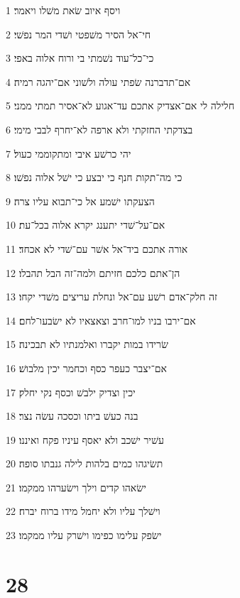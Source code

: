 \par 1 ויסף איוב שׂאת משׁלו ויאמר׃
\par 2 חי־אל הסיר משׁפטי ושׁדי המר נפשׁי׃
\par 3 כי־כל־עוד נשׁמתי בי ורוח אלוה באפי׃
\par 4 אם־תדברנה שׂפתי עולה ולשׁוני אם־יהגה רמיה׃
\par 5 חלילה לי אם־אצדיק אתכם עד־אגוע לא־אסיר תמתי ממני׃
\par 6 בצדקתי החזקתי ולא ארפה לא־יחרף לבבי מימי׃
\par 7 יהי כרשׁע איבי ומתקוממי כעול׃
\par 8 כי מה־תקות חנף כי יבצע כי ישׁל אלוה נפשׁו׃
\par 9 הצעקתו ישׁמע אל כי־תבוא עליו צרה׃
\par 10 אם־על־שׁדי יתענג יקרא אלוה בכל־עת׃
\par 11 אורה אתכם ביד־אל אשׁר עם־שׁדי לא אכחד׃
\par 12 הן־אתם כלכם חזיתם ולמה־זה הבל תהבלו׃
\par 13 זה חלק־אדם רשׁע עם־אל ונחלת עריצים משׁדי יקחו׃
\par 14 אם־ירבו בניו למו־חרב וצאצאיו לא ישׂבעו־לחם׃
\par 15 שׂרידו במות יקברו ואלמנתיו לא תבכינה׃
\par 16 אם־יצבר כעפר כסף וכחמר יכין מלבושׁ׃
\par 17 יכין וצדיק ילבשׁ וכסף נקי יחלק׃
\par 18 בנה כעשׁ ביתו וכסכה עשׂה נצר׃
\par 19 עשׁיר ישׁכב ולא יאסף עיניו פקח ואיננו׃
\par 20 תשׂיגהו כמים בלהות לילה גנבתו סופה׃
\par 21 ישׂאהו קדים וילך וישׂערהו ממקמו׃
\par 22 וישׁלך עליו ולא יחמל מידו ברוח יברח׃
\par 23 ישׂפק עלימו כפימו וישׁרק עליו ממקמו׃

\chapter{28}

